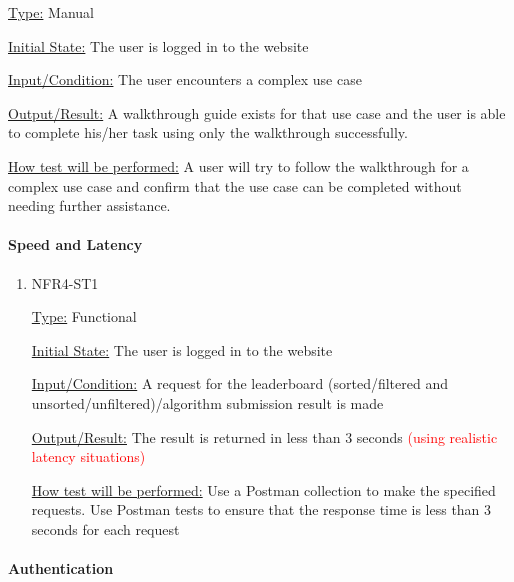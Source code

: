 \documentclass[12pt, titlepage]{article}
\begin{document}
\begin{enumerate}
\underline{Type:} Manual

\underline{Initial State:} The user is logged in to the website

\underline{Input/Condition:} The user encounters a complex use case

\underline{Output/Result:} A walkthrough guide exists for that use case and the user is able to complete his/her task using only the walkthrough successfully.

\underline{How test will be performed:} 
A user will try to follow the walkthrough for a complex use case and confirm that the use case can be completed without needing further assistance.

\end{enumerate}

\paragraph{Speed and Latency}

\begin{enumerate}

\item{NFR4-ST1\\}

\underline{Type:} Functional

\underline{Initial State:} The user is logged in to the website

\underline{Input/Condition:}  A request for the leaderboard (sorted/filtered and unsorted/unfiltered)/algorithm submission result is made

\underline{Output/Result:} The result is returned in less than 3 seconds \textcolor{red}{(using realistic latency situations)}

\underline{How test will be performed:} Use a Postman collection to make the specified requests. Use Postman tests to ensure that the response time is less than 3 seconds for each request 

\end{enumerate}

\paragraph{Authentication}
\end{document}
